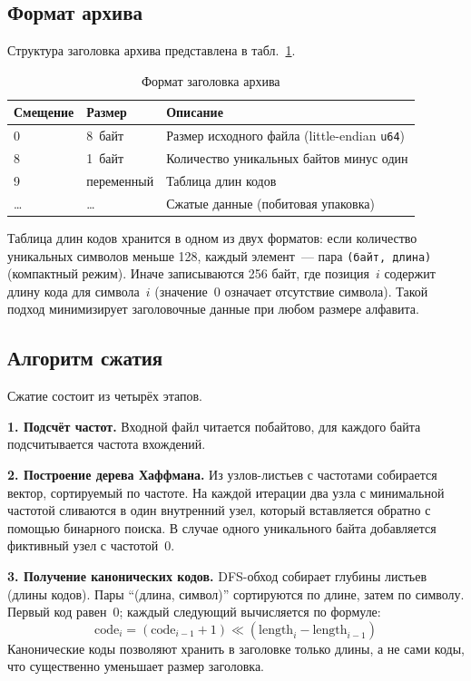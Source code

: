 \documentclass[a4paper]{article}
\begin{document}
\subsection{Формат архива}

Структура заголовка архива представлена в табл.~\ref{tab:header}.

\begin{table}[h]
\centering
\caption{Формат заголовка архива}\label{tab:header}
\begin{tabular}{lll}
\toprule
\textbf{Смещение} & \textbf{Размер} & \textbf{Описание} \\
\midrule
0  & 8~байт & Размер исходного файла (little-endian \texttt{u64}) \\
8  & 1~байт & Количество уникальных байтов минус один \\
9  & переменный & Таблица длин кодов \\
\ldots & \ldots & Сжатые данные (побитовая упаковка) \\
\bottomrule
\end{tabular}
\end{table}

Таблица длин кодов хранится в одном из двух форматов: если количество 
уникальных символов меньше 128, каждый элемент~--- пара \texttt{(байт, длина)} 
(компактный режим). Иначе записываются 256 байт, где позиция~$i$ содержит 
длину кода для символа~$i$ (значение~0 означает отсутствие символа). 
Такой подход минимизирует заголовочные данные при любом размере алфавита.
\subsection{Алгоритм сжатия}

Сжатие состоит из четырёх этапов.

\textbf{1. Подсчёт частот.} Входной файл читается побайтово, для каждого 
байта подсчитывается частота вхождений.

\textbf{2. Построение дерева Хаффмана.} 
Из узлов-листьев с частотами собирается вектор, сортируемый по частоте. 
На каждой итерации два узла с минимальной частотой сливаются в один 
внутренний узел, который вставляется обратно с помощью бинарного поиска. 
В случае одного уникального байта добавляется фиктивный узел с частотой~0.

\textbf{3. Получение канонических кодов.} 
DFS-обход собирает глубины листьев (длины кодов). Пары 
\enquote{(длина, символ)} сортируются по длине, затем по символу. 
Первый код равен~0; каждый следующий вычисляется по формуле:
\[\text{code}_{i} = (\text{code}_{i-1} + 1) \ll (\text{length}_i - \text{length}_{i-1})\]
Канонические коды позволяют хранить в заголовке только длины, а не сами 
коды, что существенно уменьшает размер заголовка.
\end{document}
